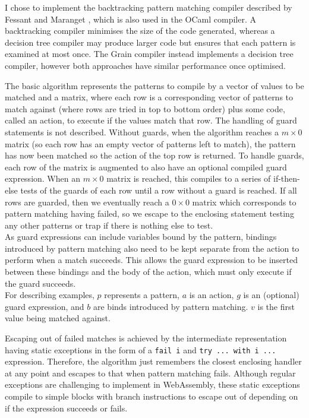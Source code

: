 I chose to implement the backtracking pattern matching compiler described by Fessant and Maranget \cite{ocamlpatternmatch}, which is also used in the OCaml compiler. A backtracking compiler minimises the size of the code generated, whereas a decision tree compiler may produce larger code but ensures that each pattern is examined at most once. The Grain compiler instead implements a decision tree compiler, however both approaches have similar performance once optimised.

The basic algorithm represents the patterns to compile by a vector of values to be matched and a matrix, where each row is a corresponding vector of patterns to match against (where rows are tried in top to bottom order) plus some code, called an action, to execute if the values match that row. The handling of guard statements is not described. Without guards, when the algorithm reaches a $m \times 0$ matrix (so each row has an empty vector of patterns left to match), the pattern has now been matched so the action of the top row is returned. To handle guards, each row of the matrix is augmented to also have an optional compiled guard expression. When an $m \times 0$ matrix is reached, this compiles to a series of if-then-else tests of the guards of each row until a row without a guard is reached. If all rows are guarded, then we eventually reach a $0 \times 0$ matrix which corresponds to pattern matching having failed, so we escape to the enclosing statement testing any other patterns or trap if there is nothing else to test. \\
As guard expressions can include variables bound by the pattern, bindings introduced by pattern matching also need to be kept separate from the action to perform when a match succeeds. This allows the guard expression to be inserted between these bindings and the body of the action, which must only execute if the guard succeeds. \\
For describing examples, $p$ represents a pattern, $a$ is an action, $g$ is an (optional) guard expression, and $b$ are binds introduced by pattern matching. $v$ is the first value being matched against.

Escaping out of failed matches is achieved by the intermediate representation having static exceptions in the form of a \verb|fail i| and \verb|try ... with i ...| expression. Therefore, the algorithm just remembers the closest enclosing handler at any point and escapes to that when pattern matching fails. Although regular exceptions are challenging to implement in WebAssembly, these static exceptions compile to simple blocks with branch instructions to escape out of depending on if the expression succeeds or fails.

